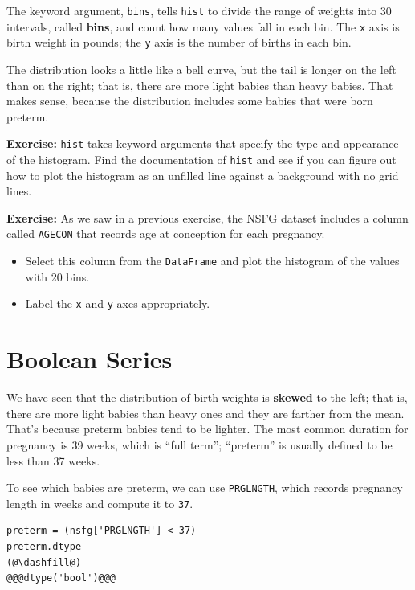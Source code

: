 The keyword argument, \passthrough{\lstinline!bins!}, tells
\passthrough{\lstinline!hist!} to divide the range of weights into 30
intervals, called \textbf{bins}, and count how many values fall in each
bin. The \passthrough{\lstinline!x!} axis is birth weight in pounds; the
\passthrough{\lstinline!y!} axis is the number of births in each bin.

The distribution looks a little like a bell curve, but the tail is
longer on the left than on the right; that is, there are more light
babies than heavy babies. That makes sense, because the distribution
includes some babies that were born preterm.

\textbf{Exercise:} \passthrough{\lstinline!hist!} takes keyword
arguments that specify the type and appearance of the histogram. Find
the documentation of \passthrough{\lstinline!hist!} and see if you can
figure out how to plot the histogram as an unfilled line against a
background with no grid lines.

\textbf{Exercise:} As we saw in a previous exercise, the NSFG dataset
includes a column called \passthrough{\lstinline!AGECON!} that records
age at conception for each pregnancy.

\begin{itemize}
\item
  Select this column from the \passthrough{\lstinline!DataFrame!} and
  plot the histogram of the values with 20 bins.
\item
  Label the \passthrough{\lstinline!x!} and \passthrough{\lstinline!y!}
  axes appropriately.
\end{itemize}

\hypertarget{boolean-series}{%
\section{Boolean Series}\label{boolean-series}}

We have seen that the distribution of birth weights is \textbf{skewed}
to the left; that is, there are more light babies than heavy ones and
they are farther from the mean. That's because preterm babies tend to be
lighter. The most common duration for pregnancy is 39 weeks, which is
``full term''; ``preterm'' is usually defined to be less than 37 weeks.

To see which babies are preterm, we can use
\passthrough{\lstinline!PRGLNGTH!}, which records pregnancy length in
weeks and compute it to \passthrough{\lstinline!37!}.

\begin{lstlisting}[]
preterm = (nsfg['PRGLNGTH'] < 37)
preterm.dtype
(@\dashfill@)
@@@dtype('bool')@@@
\end{lstlisting}


